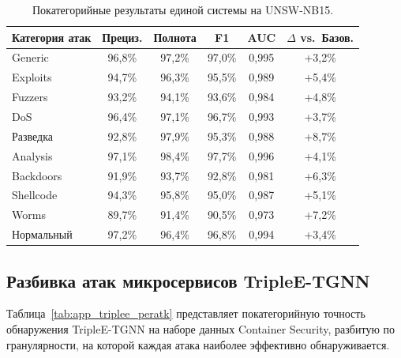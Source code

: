 \begin{table}[htbp]
\centering
\caption{Покатегорийные результаты единой системы на UNSW-NB15.}
\label{tab:app_unsw_peratk}
\begin{tabular}{lccccc}
\toprule
Категория атак & Прециз. & Полнота & F1 & AUC & $\Delta$ vs.\ Базов. \\
\midrule
Generic          & 96,8\% & 97,2\% & 97,0\% & 0,995 & +3,2\% \\
Exploits         & 94,7\% & 96,3\% & 95,5\% & 0,989 & +5,4\% \\
Fuzzers          & 93,2\% & 94,1\% & 93,6\% & 0,984 & +4,8\% \\
DoS              & 96,4\% & 97,1\% & 96,7\% & 0,993 & +3,7\% \\
Разведка         & 92,8\% & 97,9\% & 95,3\% & 0,988 & +8,7\% \\
Analysis         & 97,1\% & 98,4\% & 97,7\% & 0,996 & +4,1\% \\
Backdoors        & 91,9\% & 93,7\% & 92,8\% & 0,981 & +6,3\% \\
Shellcode        & 94,3\% & 95,8\% & 95,0\% & 0,987 & +5,1\% \\
Worms            & 89,7\% & 91,4\% & 90,5\% & 0,973 & +7,2\% \\
\midrule
Нормальный       & 97,2\% & 96,4\% & 96,8\% & 0,994 & +3,4\% \\
\bottomrule
\end{tabular}
\end{table}


\subsection{Разбивка атак микросервисов TripleE-TGNN}
\label{app:triplee_detail}

Таблица~\ref{tab:app_triplee_peratk} представляет покатегорийную точность обнаружения TripleE-TGNN на наборе данных Container Security, разбитую по гранулярности, на которой каждая атака наиболее эффективно обнаруживается.

